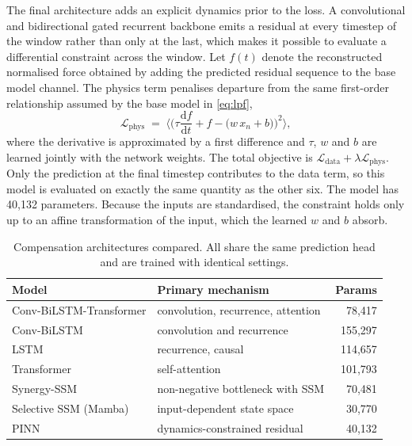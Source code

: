 The final architecture adds an explicit dynamics prior to the loss. A
convolutional and bidirectional gated recurrent backbone emits a residual at
every timestep of the window rather than only at the last, which makes it
possible to evaluate a differential constraint across the window. Let $f(t)$
denote the reconstructed normalised force obtained by adding the predicted
residual sequence to the base model channel. The physics term penalises departure
from the same first-order relationship assumed by the base model in
\eqref{eq:lpf},
\begin{equation}
  \mathcal{L}_{\mathrm{phys}} \;=\;
  \Big\langle \Big( \tau \frac{\mathrm{d}f}{\mathrm{d}t} + f
                    - \big(w\, x_n + b\big) \Big)^{2} \Big\rangle,
  \label{eq:pinn}
\end{equation}
where the derivative is approximated by a first difference and $\tau$, $w$ and
$b$ are learned jointly with the network weights. The total objective is
$\mathcal{L}_{\mathrm{data}} + \lambda \mathcal{L}_{\mathrm{phys}}$. Only the
prediction at the final timestep contributes to the data term, so this model is
evaluated on exactly the same quantity as the other six. The model has 40{,}132
parameters. Because the inputs are standardised, the constraint holds only up to
an affine transformation of the input, which the learned $w$ and $b$ absorb.

\begin{table}[!t]
\caption{Compensation architectures compared. All share the same prediction
head and are trained with identical settings.}
\label{tab:models}
\centering
\begin{tabular}{llr}
\toprule
Model & Primary mechanism & Params \\
\midrule
Conv-BiLSTM-Transformer & convolution, recurrence, attention & 78{,}417 \\
Conv-BiLSTM             & convolution and recurrence         & 155{,}297 \\
LSTM                    & recurrence, causal                 & 114{,}657 \\
Transformer             & self-attention                     & 101{,}793 \\
Synergy-SSM             & non-negative bottleneck with SSM   & 70{,}481 \\
Selective SSM (Mamba)   & input-dependent state space        & 30{,}770 \\
PINN                    & dynamics-constrained residual      & 40{,}132 \\
\bottomrule
\end{tabular}
\end{table}

